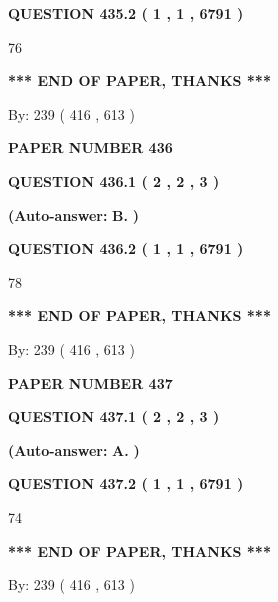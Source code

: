 \documentclass[12pt]{article}
\begin{document}
  
{\textbf{\large{QUESTION
435.2 
 ( 1 , 1 , 6791 )
}}}

76
   
   
   
   
\vspace{1.0in} 
{\textbf{\large{ *** END OF PAPER, THANKS *** }}} 
   
   
\hspace{1.0in} By: 
 239 ( 416 ,  613 )
   
   
   
   
\newpage 
\setcounter{page}{ 
   436001 } 
   
   
 {\textbf{ \Large{ PAPER NUMBER  436  }}}
   
   
   
   
  
  
{\textbf{\large{QUESTION
436.1 
 ( 2 , 2 , 3 )
}}}
 
 
{\textbf{(Auto-answer:}}
{\textbf{\large{
B.}}}
{\textbf{)}}
 
 
  
  
{\textbf{\large{QUESTION
436.2 
 ( 1 , 1 , 6791 )
}}}

78
   
   
   
   
\vspace{1.0in} 
{\textbf{\large{ *** END OF PAPER, THANKS *** }}} 
   
   
\hspace{1.0in} By: 
 239 ( 416 ,  613 )
   
   
   
   
\newpage 
\setcounter{page}{ 
   437001 } 
   
   
 {\textbf{ \Large{ PAPER NUMBER  437  }}}
   
   
   
   
  
  
{\textbf{\large{QUESTION
437.1 
 ( 2 , 2 , 3 )
}}}
 
 
{\textbf{(Auto-answer:}}
{\textbf{\large{
A.}}}
{\textbf{)}}
 
 
  
  
{\textbf{\large{QUESTION
437.2 
 ( 1 , 1 , 6791 )
}}}

74
   
   
   
   
\vspace{1.0in} 
{\textbf{\large{ *** END OF PAPER, THANKS *** }}} 
   
   
\hspace{1.0in} By: 
 239 ( 416 ,  613 )
   
   
   
\end{document}
